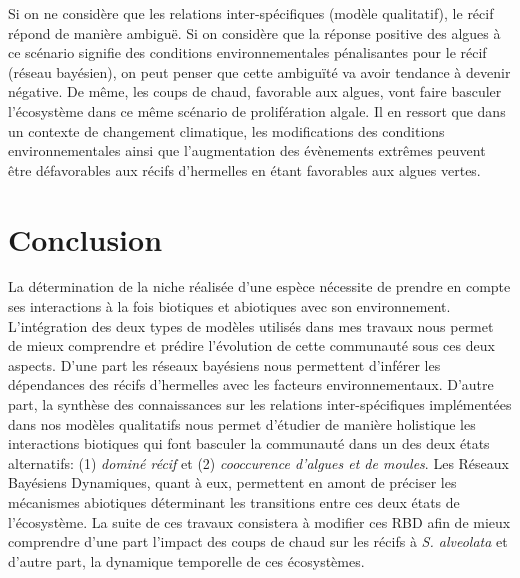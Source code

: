 \documentclass[12pt]{report}
\begin{document}
Si on ne considère que les relations inter-spécifiques (modèle qualitatif), le récif répond de manière ambiguë. Si on considère que la réponse positive des algues à ce scénario signifie des conditions environnementales pénalisantes pour le récif (réseau bayésien), on peut penser que cette ambiguïté va avoir tendance à devenir négative. De même, les coups de chaud, favorable aux algues, vont faire basculer l'écosystème dans ce même scénario de prolifération algale. Il en ressort que dans un contexte de changement climatique, les modifications des conditions environnementales ainsi que l'augmentation des évènements extrêmes peuvent être défavorables aux récifs d'hermelles en étant favorables aux algues vertes. 


\vspace{50pt}
\chapter{Conclusion}
La détermination de la niche réalisée d'une espèce nécessite de prendre en compte ses interactions à la fois biotiques et abiotiques avec son environnement. L'intégration des deux types de modèles utilisés dans mes travaux nous permet de mieux comprendre et prédire l'évolution de cette communauté sous ces deux aspects. D'une part les réseaux bayésiens nous permettent d'inférer les dépendances des récifs d'hermelles avec les facteurs environnementaux. D'autre part, la synthèse des connaissances sur les relations inter-spécifiques implémentées dans nos modèles qualitatifs nous permet d'étudier de manière holistique les interactions biotiques qui font basculer la communauté dans un des deux états alternatifs: (1) \textit{dominé récif} et (2) \textit{cooccurence d'algues et de moules}. Les Réseaux Bayésiens Dynamiques, quant à eux, permettent en amont de préciser les mécanismes abiotiques déterminant les transitions entre ces deux états de l'écosystème. La suite de ces travaux consistera à modifier ces RBD afin de mieux comprendre d'une part l'impact des coups de chaud sur les récifs à \textit{S. alveolata} et d'autre part, la dynamique temporelle de ces écosystèmes.
\newline \newline
\end{document}
